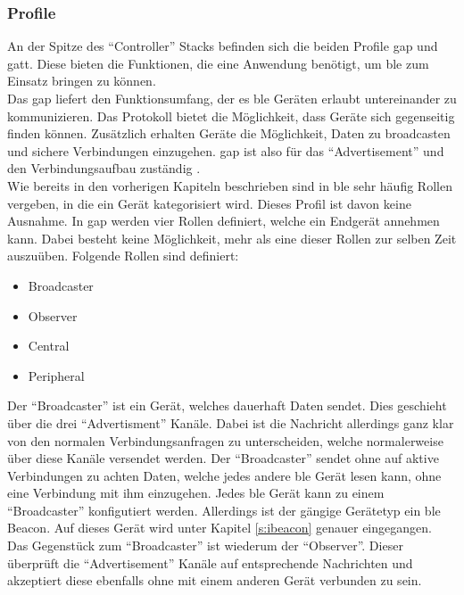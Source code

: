 \subsubsection{Profile}
\label{sss:funktionsweise:profiles}

An der Spitze des "`Controller"' Stacks befinden sich die beiden Profile \ac{gap} und \ac{gatt}. Diese bieten die Funktionen, die eine Anwendung benötigt, um \ac{ble} zum Einsatz bringen zu können.\\

\noindent Das \ac{gap} liefert den Funktionsumfang, der es \ac{ble} Geräten erlaubt untereinander zu kommunizieren. Das Protokoll bietet die Möglichkeit, dass Geräte sich gegenseitig finden können. Zusätzlich erhalten Geräte die Möglichkeit, Daten zu broadcasten und sichere Verbindungen einzugehen. \ac{gap} ist also für das "`Advertisement"' und den Verbindungsaufbau zuständig \cite[Seite 33]{Townsend14:GSB}.\\

\noindent Wie bereits in den vorherigen Kapiteln beschrieben sind in \ac{ble} sehr häufig Rollen vergeben, in die ein Gerät kategorisiert wird. Dieses Profil ist davon keine Ausnahme. In \ac{gap} werden vier Rollen definiert, welche ein Endgerät annehmen kann. Dabei besteht keine Möglichkeit, mehr als eine dieser Rollen zur selben Zeit auszuüben. Folgende Rollen sind definiert:
\begin{itemize}
	\item{Broadcaster}
	\item{Observer}
	\item{Central}
	\item{Peripheral}
\end{itemize}     

\noindent Der "`Broadcaster"' ist ein Gerät, welches dauerhaft Daten sendet. Dies geschieht über die drei "`Advertisment"' Kanäle. Dabei ist die Nachricht allerdings ganz klar von den normalen Verbindungsanfragen zu unterscheiden, welche normalerweise über diese Kanäle versendet werden. Der "`Broadcaster"' sendet ohne auf aktive Verbindungen zu achten Daten, welche jedes andere \ac{ble} Gerät lesen kann, ohne eine Verbindung mit ihm einzugehen. Jedes \ac{ble} Gerät kann zu einem "`Broadcaster"' konfigutiert werden. Allerdings ist der gängige Gerätetyp ein \ac{ble} Beacon. Auf dieses Gerät wird unter Kapitel \ref{s:ibeacon} genauer eingegangen.\\ 

\noindent Das Gegenstück zum "`Broadcaster"' ist wiederum der "`Observer"'. Dieser überprüft die "`Advertisement"' Kanäle auf entsprechende Nachrichten und akzeptiert diese ebenfalls ohne mit einem anderen Gerät verbunden zu sein.\\

